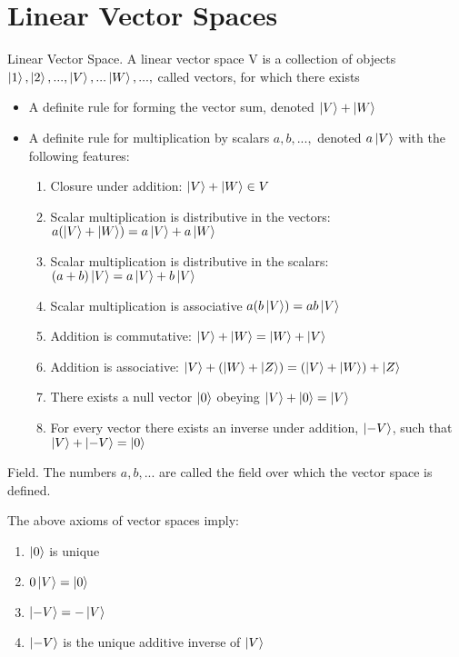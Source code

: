 \section{Linear Vector Spaces}
\begin{definition}{Linear Vector Space.}
A linear vector space V is a collection of objects $\ket{1}, \ket{2},...,\ket{V},...\ket{W},...,$ called vectors, for which there exists \\

\begin{itemize}
	\item A definite rule for forming the vector sum, denoted $\ket{V} + \ket{W}$
	\item A definite rule for multiplication by scalars $a,b,...,$ denoted $a\ket{V}$ with the following features:
	\begin{enumerate}
		\item Closure under addition: $\ket{V} + \ket{W} \in V$
		\item Scalar multiplication is distributive in the vectors: $a(\ket{V} + \ket{W}) = a\ket{V} + a\ket{W}$
		\item Scalar multiplication is distributive in the scalars: $(a + b)\ket{V} = a\ket{V} + b\ket{V}$
		\item Scalar multiplication is associative $a(b\ket{V}) = ab\ket{V}$
		\item Addition is commutative: $\ket{V} + \ket{W} = \ket{W} + \ket{V}$
		\item Addition is associative: $\ket{V} + (\ket{W} + \ket{Z}) = (\ket{V} + \ket{W}) + \ket{Z}$
		\item There exists a null vector $\ket{0}$ obeying $\ket{V} + \ket{0} = \ket{V}$
		\item For every vector there exists an inverse under addition, $\ket{-V}$, such that $\ket{V} + \ket{-V} = \ket{0}$
	\end{enumerate}
\end{itemize}
\end{definition}

\begin{definition}{Field.} 
The numbers $a,b,...$ are called the field over which the vector space is defined.
\end{definition}

\begin{theorem}{}
	The above axioms of vector spaces imply:
	\begin{enumerate}
		\item $\ket{0}$ is unique
		\item $0\ket{V} = \ket{0}$
		\item $\ket{-V} = -\ket{V}$
		\item $\ket{-V}$ is the unique additive inverse of $\ket{V}$
	\end{enumerate}
\end{theorem}

